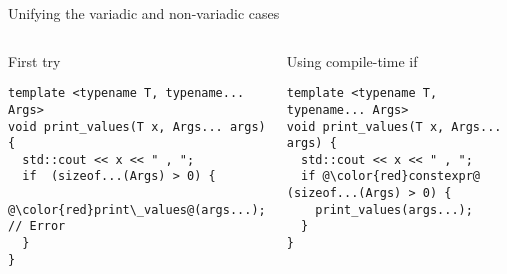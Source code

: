 \begin{frame}[t,fragile]{Unifying the variadic and non-variadic cases}

\begin{columns}[T]

\begin{block}{First try}
\begin{lstlisting}[escapechar=@]
template <typename T, typename... Args>
void print_values(T x, Args... args) {
  std::cout << x << " , ";
  if  (sizeof...(Args) > 0) { 
    @\color{red}print\_values@(args...); // Error
  }
}
\end{lstlisting}
\end{block}

\pause
{}
\begin{block}{Using compile-time if}
\begin{lstlisting}[escapechar=@]
template <typename T, typename... Args>
void print_values(T x, Args... args) {
  std::cout << x << " , ";
  if @\color{red}constexpr@ (sizeof...(Args) > 0) { 
    print_values(args...); 
  }
}
\end{lstlisting}
\end{block}
\end{columns}
\end{frame}
